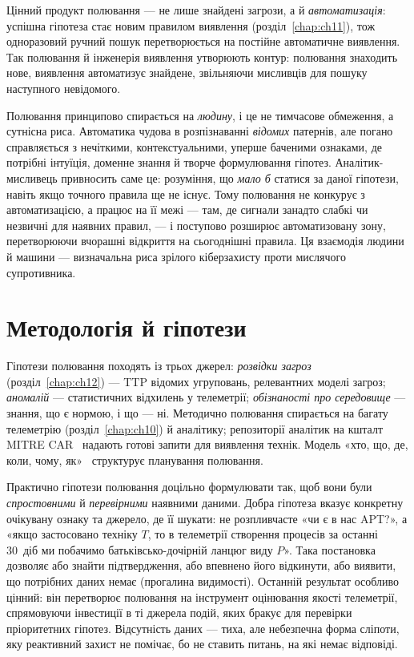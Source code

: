 Цінний продукт полювання --- не лише знайдені загрози, а й \emph{автоматизація}: успішна гіпотеза стає новим правилом виявлення (розділ~\ref{chap:ch11}), тож одноразовий ручний пошук перетворюється на постійне автоматичне виявлення. Так полювання й інженерія виявлення утворюють контур: полювання знаходить нове, виявлення автоматизує знайдене, звільняючи мисливців для пошуку наступного невідомого.

Полювання принципово спирається на \emph{людину}, і це не тимчасове обмеження, а сутнісна риса. Автоматика чудова в розпізнаванні \emph{відомих} патернів, але погано справляється з нечіткими, контекстуальними, уперше баченими ознаками, де потрібні інтуїція, доменне знання й творче формулювання гіпотез. Аналітик-мисливець привносить саме це: розуміння, що \emph{мало б} статися за даної гіпотези, навіть якщо точного правила ще не існує. Тому полювання не конкурує з автоматизацією, а працює на її межі --- там, де сигнали занадто слабкі чи незвичні для наявних правил, --- і поступово розширює автоматизовану зону, перетворюючи вчорашні відкриття на сьогоднішні правила. Ця взаємодія людини й машини --- визначальна риса зрілого кіберзахисту проти мислячого супротивника.

\section{Методологія й гіпотези}\label{sec:ch13-methodology}

Гіпотези полювання походять із трьох джерел: \emph{розвідки загроз} (розділ~\ref{chap:ch12}) --- TTP відомих угруповань, релевантних моделі загроз; \emph{аномалій} --- статистичних відхилень у телеметрії; \emph{обізнаності про середовище} --- знання, що є нормою, і що --- ні. Методично полювання спирається на багату телеметрію (розділ~\ref{chap:ch10}) й аналітику; репозиторії аналітик на кшталт MITRE CAR~\cite{mitre-car} надають готові запити для виявлення технік. Модель «хто, що, де, коли, чому, як»~\cite{ch13:ocm} структурує планування полювання.

Практично гіпотези полювання доцільно формулювати так, щоб вони були \emph{спростовними} й \emph{перевірними} наявними даними. Добра гіпотеза вказує конкретну очікувану ознаку та джерело, де її шукати: не розпливчасте «чи є в нас APT?», а «якщо застосовано техніку $T$, то в телеметрії створення процесів за останні 30~діб ми побачимо батьківсько-дочірній ланцюг виду $P$». Така постановка дозволяє або знайти підтвердження, або впевнено його відкинути, або виявити, що потрібних даних немає (прогалина видимості). Останній результат особливо цінний: він перетворює полювання на інструмент оцінювання якості телеметрії, спрямовуючи інвестиції в ті джерела подій, яких бракує для перевірки пріоритетних гіпотез. Відсутність даних --- тиха, але небезпечна форма сліпоти, яку реактивний захист не помічає, бо не ставить питань, на які немає відповіді.


